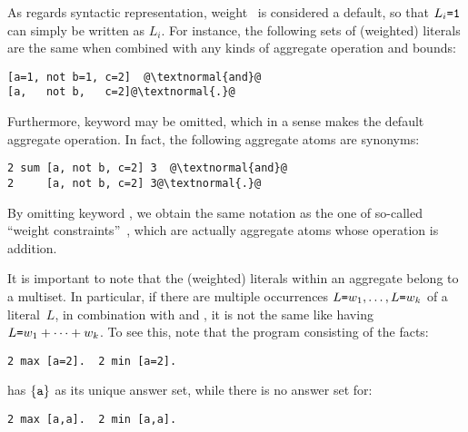 As regards syntactic representation,
weight~ is considered a default,
so that $L_i\texttt{=}\texttt{1}$ can simply be written as $L_i$.
For instance, the following sets of (weighted) literals are the same
when combined with any kinds of aggregate operation and bounds:
\begin{lstlisting}[numbers=none,escapechar=@]
[a=1, not b=1, c=2]  @\textnormal{and}@
[a,   not b,   c=2]@\textnormal{.}@
\end{lstlisting}
%
Furthermore,
keyword  may be omitted, which in a sense makes  the default
aggregate operation.
In fact, the following aggregate atoms are synonyms:
\begin{lstlisting}[numbers=none,escapechar=@]
2 sum [a, not b, c=2] 3  @\textnormal{and}@
2     [a, not b, c=2] 3@\textnormal{.}@
\end{lstlisting}
By omitting keyword , we obtain the same notation as the one of 
so-called ``weight constraints''~\cite{siniso02a,lparseManual}, which are actually aggregate atoms
whose operation is addition.

It is important to note that the (weighted) literals within an aggregate
belong to a multiset.
In particular, if there are multiple occurrences
$L\texttt{=}w_1,\dots,L\texttt{=}w_k$
of a literal~$L$, in combination with  and ,
it is not the same like having $L\texttt{=}w_1+\dots+w_k$.
To see this, note that the program consisting of the facts:
\begin{lstlisting}[numbers=none]
2 max [a=2].  2 min [a=2].
\end{lstlisting}
has $\{\texttt{a}\}$ as its unique answer set, while there is no answer set for:
\begin{lstlisting}[numbers=none]
2 max [a,a].  2 min [a,a].
\end{lstlisting}

